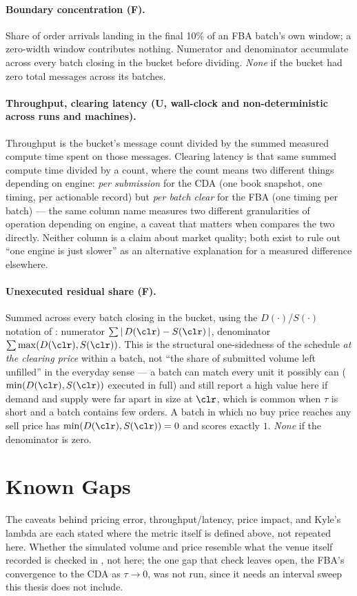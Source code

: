 \paragraph{Boundary concentration (F).} Share of order arrivals landing
in the final 10\% of an FBA batch's own window; a zero-width window
contributes nothing. Numerator and denominator accumulate across every
batch closing in the bucket before dividing. \emph{None} if the bucket
had zero total messages across its batches.

\paragraph{Throughput, clearing latency (U, wall-clock and
non-deterministic across runs and machines).} Throughput is the bucket's
message count divided by the summed measured compute time spent on
those messages. Clearing latency is that same summed compute time
divided by a count, where the count means two different things
depending on engine: \emph{per submission} for the CDA (one book
snapshot, one timing, per actionable record) but \emph{per batch clear}
for the FBA (one timing per batch) --- the same column name measures two
different granularities of operation depending on engine, a caveat that
matters when  compares the two directly. Neither column
is a claim about market quality; both exist to rule out ``one engine is
just slower'' as an alternative explanation for a measured difference
elsewhere.

\paragraph{Unexecuted residual share (F).} Summed across every batch
closing in the bucket, using the $D(\cdot)$/$S(\cdot)$ notation of
: numerator $\sum |\,D(\clr) - S(\clr)\,|$,
denominator $\sum \max(D(\clr),S(\clr))$. This is the structural
one-sidedness of the schedule \emph{at the clearing price} within a
batch, not ``the share of submitted volume left unfilled'' in the everyday
sense --- a batch can match every
unit it possibly can ($\min(D(\clr),S(\clr))$ executed in full) and still
report a high value here if demand and supply were far apart in size at
$\clr$, which is common when $\tau$ is short and a batch contains few
orders. A batch in which no buy price reaches any sell price has
$\min(D(\clr),S(\clr)) = 0$ and scores exactly $1$. \emph{None} if the
denominator is zero.

\section{Known Gaps}

The caveats behind pricing error, throughput/latency, price impact, and
Kyle's lambda are each stated where the metric itself is defined above,
not repeated here. Whether the simulated volume and price resemble what
the venue itself recorded is checked in ,
not here; the one gap that check leaves open, the FBA's convergence to the
CDA as $\tau \to 0$, was not run, since it needs an interval sweep this
thesis does not include.

